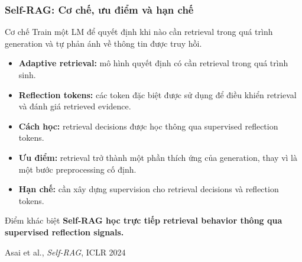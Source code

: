 
\begin{frame}
    \frametitle{Self-RAG: Cơ chế, ưu điểm và hạn chế}

    \small

    \begin{block}{Cơ chế}
        Train một LM để quyết định khi nào cần retrieval trong quá
        trình generation và tự phản ánh về thông tin được truy hồi.
    \end{block}

    \vspace{0.15cm}

    \begin{itemize}
        \setlength{\itemsep}{4pt}

        \item \textbf{Adaptive retrieval:}
        mô hình quyết định có cần retrieval trong quá trình sinh.

        \item \textbf{Reflection tokens:}
        các token đặc biệt được sử dụng để điều khiển retrieval
        và đánh giá retrieved evidence.

        \item \textbf{Cách học:}
        retrieval decisions được học thông qua
        supervised reflection tokens.

        \item \textbf{Ưu điểm:}
        retrieval trở thành một phần thích ứng của generation,
        thay vì là một bước preprocessing cố định.

        \item \textbf{Hạn chế:}
        cần xây dựng supervision cho retrieval decisions và
        reflection tokens.

    \end{itemize}

    \vspace{0.08cm}

    \begin{block}{Điểm khác biệt}
        \centering
        \textbf{Self-RAG học trực tiếp retrieval behavior thông qua
        supervised reflection signals.}
    \end{block}

    \vspace{0.02cm}

    \begin{center}
        \scriptsize
        Asai et al., \textit{Self-RAG}, ICLR 2024
    \end{center}

\end{frame}


